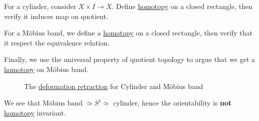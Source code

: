 \begin{explanation}
	For a cylinder, consider \(X\times I \to X\). Define \hyperref[def:homotopy]{homotopy} on a closed rectangle, then
	verify it induces map on quotient.

	For a Möbius band, we define a \hyperref[def:homotopy]{homotopy} on a closed rectangle, then verify
	that it respect the equivalence relation.

	Finally, we use the universal property of quotient topology to argue that we get a
	\hyperref[def:homotopy]{homotopy} on Möbius band.

	\begin{figure}[H]
		\centering
		\caption{The \hyperref[def:deformation-retraction]{deformation retraction} for Cylinder and Möbius band}
		\label{fig:eg:cylinder-mobiusband}
	\end{figure}

	\begin{remark}
		We see that \(\text{Möbius band } \simeq S^1 \simeq \text{ cylinder} \), hence the orientability
		is \textbf{not} \hyperref[def:homotopy]{homotopy} invariant.
	\end{remark}
\end{explanation}